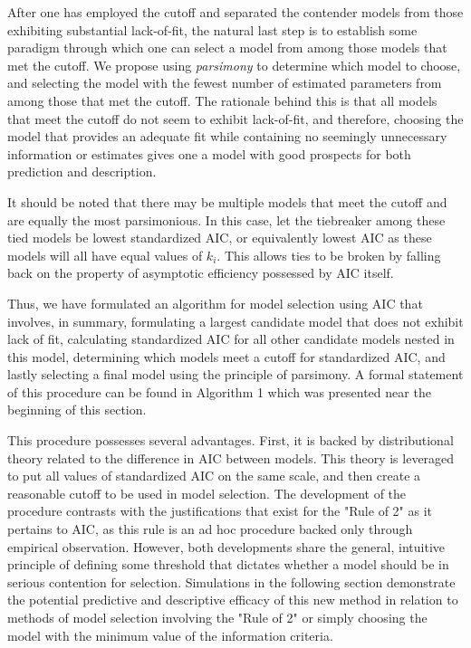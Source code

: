 		After one has employed the cutoff and separated the contender models from those exhibiting substantial lack-of-fit, the natural last step is to establish some paradigm
		through which one can select a model from among those models that met the cutoff. We propose using \textit{parsimony} to determine which model to choose, and selecting
		the model with the fewest number of estimated parameters from among those that met the cutoff. The rationale behind this is that all models that meet the cutoff do
		not seem to exhibit lack-of-fit, and therefore, choosing the model that provides an adequate fit while containing no seemingly unnecessary information or estimates
		gives one a model with good prospects for both prediction and description.
		
		It should be noted that there may be multiple models that meet the cutoff and are equally the most parsimonious. In this case, let the tiebreaker among these tied models be
		lowest standardized AIC, or equivalently lowest AIC as these models will all have equal values of $k_i$. This allows ties to be broken
		by falling back on the property of asymptotic efficiency possessed by AIC itself.

		Thus, we have formulated an algorithm for model selection using AIC that involves, in summary, formulating a largest candidate model that does not exhibit lack of
		fit, calculating standardized AIC for all other candidate models nested in this model, determining which models meet a cutoff for standardized AIC, and lastly selecting
		a final model using the principle of parsimony. A formal statement of this procedure can be found in Algorithm 1 which was presented near the beginning of this section.

		This procedure possesses several advantages. First, it is backed by distributional theory related to the difference in AIC between models. This theory is leveraged
		to put all values of standardized AIC on the same scale, and then create a reasonable cutoff to be used in model selection. The development of the procedure
		contrasts with the justifications that exist for the "Rule of 2" as it pertains to AIC, as this rule is an ad hoc procedure backed only through empirical
		observation. However, both developments share the general, intuitive principle of defining some threshold that dictates whether a model should be in serious
		contention for selection. Simulations in the following section demonstrate the potential predictive and descriptive efficacy of this new method in relation
		to methods of model selection involving the "Rule of 2" or simply choosing the model with the minimum value of the information criteria.
		
